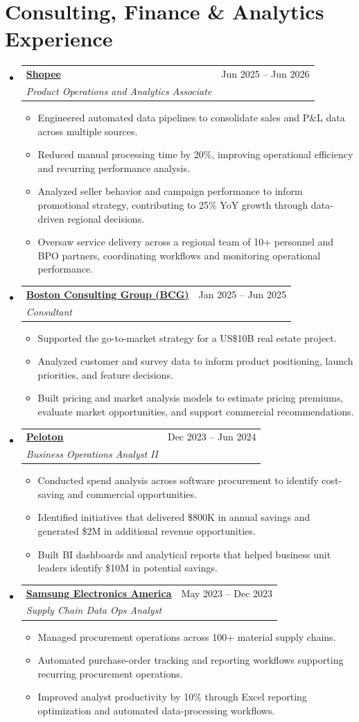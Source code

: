 \documentclass[a4paper,11pt]{article}
\makeatletter
\newcommand{\resumeItem}[1]{
  \item\small{
    {#1\par\vspace{-2pt}}
  }
}
\newcommand{\resumeSubheading}[4]{
  \vspace{-2pt}\item
    \begin{tabular*}{0.97\textwidth}[t]{l@{\extracolsep{\fill}}r}
      \textbf{#1} & #2 \\
      \textit{\small#3} & \textit{\small #4} \\
    \end{tabular*}\vspace{-7pt}
}
\newcommand{\resumeSubHeadingListStart}{\begin{itemize}[leftmargin=0.15in, label={}]}
\newcommand{\resumeSubHeadingListEnd}{\end{itemize}}
\newcommand{\resumeItemListStart}{\begin{itemize}}
\newcommand{\resumeItemListEnd}{\end{itemize}\vspace{-5pt}}
\makeatother
\begin{document}
\section{Consulting, Finance \& Analytics Experience}
\resumeSubHeadingListStart
  \resumeSubheading
    {\href{https://www.sea.com/products/shopee}{Shopee}}{Jun 2025 -- Jun 2026}
    {Product Operations and Analytics Associate}{}
    \resumeItemListStart
      \resumeItem{Engineered automated data pipelines to consolidate sales and P\&L data across multiple sources.}
      \resumeItem{Reduced manual processing time by 20\%, improving operational efficiency and recurring performance analysis.}
      \resumeItem{Analyzed seller behavior and campaign performance to inform promotional strategy, contributing to 25\% YoY growth through data-driven regional decisions.}
      \resumeItem{Oversaw service delivery across a regional team of 10+ personnel and BPO partners, coordinating workflows and monitoring operational performance.}
    \resumeItemListEnd
  \resumeSubheading
    {\href{https://www.bcg.com/about/overview}{Boston Consulting Group (BCG)}}{Jan 2025 -- Jun 2025}
    {Consultant}{}
    \resumeItemListStart
      \resumeItem{Supported the go-to-market strategy for a US\$10B real estate project.}
      \resumeItem{Analyzed customer and survey data to inform product positioning, launch priorities, and feature decisions.}
      \resumeItem{Built pricing and market analysis models to estimate pricing premiums, evaluate market opportunities, and support commercial recommendations.}
    \resumeItemListEnd
  \resumeSubheading
    {\href{https://www.onepeloton.com/company}{Peloton}}{Dec 2023 -- Jun 2024}
    {Business Operations Analyst II}{}
    \resumeItemListStart
      \resumeItem{Conducted spend analysis across software procurement to identify cost-saving and commercial opportunities.}
      \resumeItem{Identified initiatives that delivered \$800K in annual savings and generated \$2M in additional revenue opportunities.}
      \resumeItem{Built BI dashboards and analytical reports that helped business unit leaders identify \$10M in potential savings.}
    \resumeItemListEnd
  \resumeSubheading
    {\href{https://www.samsung.com/us/about-us/our-business/}{Samsung Electronics America}}{May 2023 -- Dec 2023}
    {Supply Chain Data Ops Analyst}{}
    \resumeItemListStart
      \resumeItem{Managed procurement operations across 100+ material supply chains.}
      \resumeItem{Automated purchase-order tracking and reporting workflows supporting recurring procurement operations.}
      \resumeItem{Improved analyst productivity by 10\% through Excel reporting optimization and automated data-processing workflows.}
    \resumeItemListEnd
\resumeSubHeadingListEnd
\end{document}
